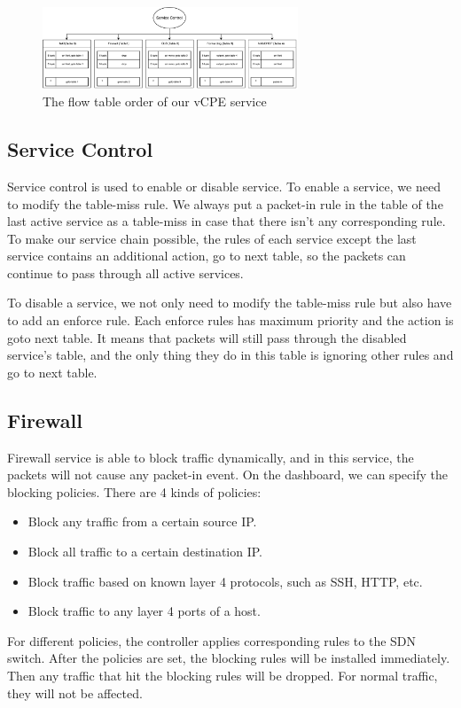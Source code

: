 \documentclass[journal]{IEEEtran}
\begin{document}
\begin{figure}[!t]
\centering
\includegraphics[width=3in]{./figures/multiple_table}
\caption{The flow table order of our vCPE service}
\label{fig:table-seq}
\end{figure}


\subsection{Service Control}
Service control is used to enable or disable service. To enable a service, we need to modify the table-miss rule. We always put a packet-in rule in the table of the last active service as a table-miss in case that there isn't any corresponding rule. To make our service chain possible, the rules of each service except the last service contains an additional action, go to next table, so the packets can continue to pass through all active services.

To disable a service, we not only need to modify the table-miss rule but also have to add an enforce rule. Each enforce rules has maximum priority and the action is goto next table. It means that packets will still pass through the disabled service's table, and the only thing they do in this table is ignoring other rules and go to next table.


\subsection{Firewall}
Firewall service is able to block traffic dynamically, and in this service, the packets will not cause any packet-in event.
On the dashboard, we can specify the blocking policies. There are 4 kinds of policies:
\begin{itemize}
\item Block any traffic from a certain source IP.
\item Block all traffic to a certain destination IP.
\item Block traffic based on known layer 4 protocols, such as SSH, HTTP, etc.
\item Block traffic to any layer 4 ports of a host.
\end{itemize}

For different policies, the controller applies corresponding rules to the SDN switch. After the policies are set, the blocking rules will be installed immediately. Then any traffic that hit the blocking rules will be dropped. For normal traffic, they will not be affected.
\end{document}
